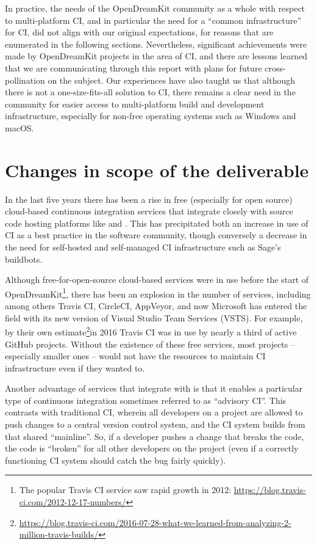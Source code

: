 \documentclass{deliverablereport}
\begin{document}
In practice, the needs of the OpenDreamKit community as a whole with respect to
multi-platform CI, and in particular the need for a ``common infrastructure''
for CI, did not align with our original expectations, for reasons that are
enumerated in the following sections.  Nevertheless, significant achievements
were made by OpenDreamKit projects in the area of CI, and there are lessons
learned that we are communicating through this report with plans for future
cross-pollination on the subject.  Our experiences have also taught us that
although there is not a one-size-fits-all solution to CI, there remains a clear
need in the community for easier access to multi-platform build and development
infrastructure, especially for non-free operating systems such as Windows and
macOS.

\hypertarget{changes-to-deliverable}{%
\section{Changes in scope of the deliverable}\label{changes-to-deliverable}}

In the last five years there has been a rise in free (especially for open
source) cloud-based continuous integration services that integrate closely with
source code hosting platforms like \GitHub and \GitLab.  This has precipitated
both an increase in use of CI as a best practice in the software community,
though conversely a decrease in the need for self-hosted and self-managed CI
infrastructure such as Sage's buildbots.

Although free-for-open-source cloud-based services were in use before the start
of OpenDreamKit\footnote{The popular Travis CI service saw rapid growth in
2012: \url{https://blog.travis-ci.com/2012-12-17-numbers/}}, there has been an
explosion in the number of services, including among others Travis CI,
CircleCI, AppVeyor, and now Microsoft has entered the field with its new
version of Visual Studio Team Services (VSTS).  For example, by their own
estimate\footnote{\url{https://blog.travis-ci.com/2016-07-28-what-we-learned-from-analyzing-2-million-travis-builds/}}in
2016 Travis CI was in use by nearly a third of active GitHub projects.  Without
the existence of these free services, most projects -- especially smaller
ones -- would not have the resources to maintain CI infrastructure even if they
wanted to.

Another advantage of services that integrate with \GitHub is that it enables a
particular type of continuous integration sometimes referred to as ``advisory
CI''.  This contrasts with traditional CI, wherein all developers on a project
are allowed to push changes to a central version control system, and the CI
system builds from that shared ``mainline''.  So, if a developer
pushes a change that breaks the code, the code is ``broken''
for all other developers on the project (even if a correctly functioning CI
system should catch the bug fairly quickly).
\end{document}
